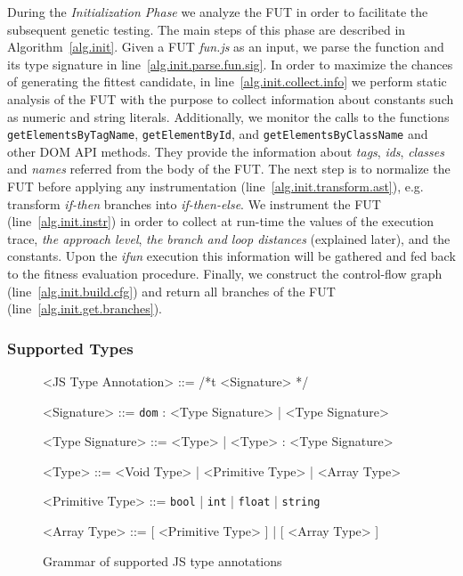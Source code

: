 During the \emph{Initialization Phase} we analyze the FUT in order to facilitate the subsequent genetic testing. The main steps of this phase are described in Algorithm~\ref{alg.init}. Given a FUT \emph{fun.js} as an input, we parse the function and its type signature in line~\ref{alg.init.parse.fun.sig}. In order to maximize the chances of generating the fittest candidate, in line~\ref{alg.init.collect.info} we perform static analysis of the FUT with the purpose to collect information about constants such as numeric and string literals. Additionally, we monitor the calls to the functions \texttt{getElementsByTagName}, \texttt{getElementById}, and \texttt{getElementsByClassName} and other DOM API methods. They provide the information about \emph{tags}, \emph{ids}, \emph{classes} and \emph{names} referred from the body of the FUT. The next step is to normalize the FUT before applying any instrumentation (line~\ref{alg.init.transform.ast}), e.g. transform \emph{if-then} branches into \emph{if-then-else}. We instrument the FUT (line~\ref{alg.init.instr}) in order to collect at run-time the values of the execution trace, \emph{the approach level}, \emph{the branch and loop distances} (explained later), and the constants. Upon the \emph{ifun} execution this information will be gathered and fed back to the fitness evaluation procedure. Finally, we construct the control-flow graph (line~\ref{alg.init.build.cfg}) and return all branches of the FUT (line~\ref{alg.init.get.branches}).

\subsubsection{Supported Types}
\label{sub.sec.sup.types}

\begin{figure}[!t]
\setlength{\grammarparsep}{3pt}
\scriptsize
\begin{grammar}
<JS Type Annotation> ::= /*t <Signature> */

<Signature> ::= \texttt{dom} : <Type Signature> | <Type Signature>

<Type Signature> ::= <Type> | <Type> : <Type Signature>

<Type> ::= <Void Type> | <Primitive Type> | <Array Type>

<Primitive Type> ::= \texttt{bool} | \texttt{int} | \texttt{float} | \texttt{string}

<Array Type> ::= [ <Primitive Type> ] | [ <Array Type> ]
\end{grammar}
\caption{Grammar of supported JS type annotations}
\label{fig.js.type.annot}
\end{figure}

